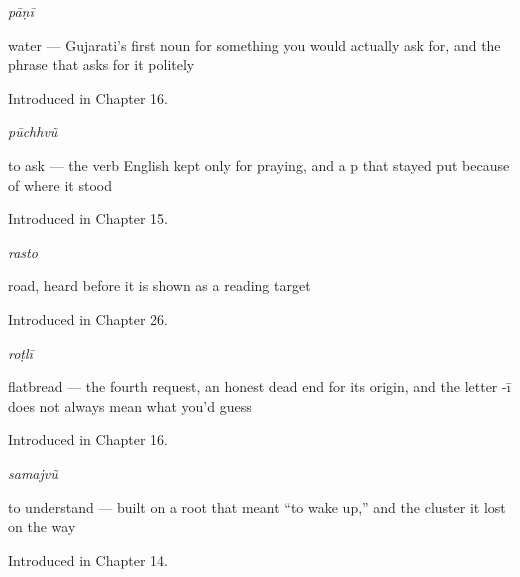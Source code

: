\noindent\begin{minipage}[t]{\linewidth}
\raggedright
\textbf{}\enspace\emph{pāṇī}\par
\small water — Gujarati's first noun for something you would actually ask for, and the phrase that asks for it politely\par
\footnotesize Introduced in Chapter 16.
\end{minipage}\par\medskip

\noindent\begin{minipage}[t]{\linewidth}
\raggedright
\textbf{}\enspace\emph{pūchhvũ}\par
\small to ask — the verb English kept only for praying, and a p that stayed put because of where it stood\par
\footnotesize Introduced in Chapter 15.
\end{minipage}\par\medskip

\noindent\begin{minipage}[t]{\linewidth}
\raggedright
\textbf{}\enspace\emph{rasto}\par
\small road, heard before it is shown as a reading target\par
\footnotesize Introduced in Chapter 26.
\end{minipage}\par\medskip

\noindent\begin{minipage}[t]{\linewidth}
\raggedright
\textbf{}\enspace\emph{roṭlī}\par
\small flatbread — the fourth request, an honest dead end for its origin, and the letter -ī does not always mean what you'd guess\par
\footnotesize Introduced in Chapter 16.
\end{minipage}\par\medskip

\noindent\begin{minipage}[t]{\linewidth}
\raggedright
\textbf{}\enspace\emph{samajvũ}\par
\small to understand — built on a root that meant \textquotedblleft{}to wake up,\textquotedblright{} and the cluster it lost on the way\par
\footnotesize Introduced in Chapter 14.
\end{minipage}\par\medskip

